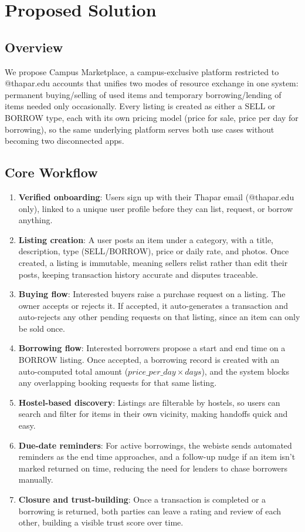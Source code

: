 \documentclass[12pt,a4paper]{article}
\begin{document}
\section{Proposed Solution}
\subsection{Overview}
We propose Campus Marketplace, a campus-exclusive platform restricted to @thapar.edu accounts that unifies two modes of resource exchange in one system: permanent buying/selling of used items and temporary borrowing/lending of items needed only occasionally. Every listing is created as either a SELL or BORROW type, each with its own pricing model (price for sale, price per day for borrowing), so the same underlying platform serves both use cases without becoming two disconnected apps.
\subsection{Core Workflow}
\begin{enumerate}[leftmargin=0.7cm]
    \item \textbf{Verified onboarding}: Users sign up with their Thapar email (@thapar.edu only), linked to a unique user profile before they can list, request, or borrow anything.
    \item \textbf{Listing creation}: A user posts an item under a category, with a title, description, type (SELL/BORROW), price or daily rate, and photos. Once created, a listing is immutable, meaning sellers relist rather than edit their posts, keeping transaction history accurate and disputes traceable.
    \item \textbf{Buying flow}: Interested buyers raise a purchase request on a listing. The owner accepts or rejects it. If accepted, it auto-generates a transaction and auto-rejects any other pending requests on that listing, since an item can only be sold once.
    \item \textbf{Borrowing flow}: Interested borrowers propose a start and end time on a BORROW listing. Once accepted, a borrowing record is created with an auto-computed total amount ($price\_per\_day \times days$), and the system blocks any overlapping booking requests for that same listing.
    \item \textbf{Hostel-based discovery}: Listings are filterable by hostels, so users can search and filter for items in their own vicinity, making handoffs quick and easy.
    \item \textbf{Due-date reminders}: For active borrowings, the webiste sends automated reminders as the end time approaches, and a follow-up nudge if an item isn't marked returned on time, reducing the need for lenders to chase borrowers manually.
    \item \textbf{Closure and trust-building}: Once a transaction is completed or a borrowing is returned, both parties can leave a rating and review of each other, building a visible trust score over time.
\end{enumerate}
\end{document}
